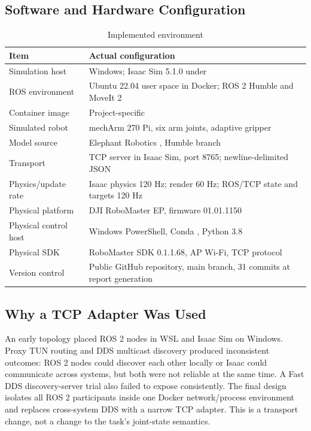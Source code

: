 \documentclass[UTF8,zihao=-4,scheme=chinese,fontset=none]{ctexart}
\begin{document}
\subsection{Software and Hardware Configuration}
\begin{table}[H]\centering\caption{Implemented environment}\label{tab:environment}
\begin{tabularx}{\textwidth}{p{3.4cm}Y}
\toprule Item & Actual configuration\\\midrule
Simulation host & Windows; Isaac Sim 5.1.0 under \\
ROS environment & Ubuntu 22.04 user space in Docker; ROS 2 Humble and MoveIt 2\\
Container image & Project-specific \\
Simulated robot & mechArm 270 Pi, six arm joints, adaptive gripper\\
Model source & Elephant Robotics , Humble branch\cite{elephantrepo}\\
Transport & TCP server in Isaac Sim, port 8765; newline-delimited JSON\\
Physics/update rate & Isaac physics 120 Hz; render 60 Hz; ROS/TCP state and targets 120 Hz\\
Physical platform & DJI RoboMaster EP, firmware 01.01.1150\\
Physical control host & Windows PowerShell, Conda , Python 3.8\\
Physical SDK & RoboMaster SDK 0.1.1.68, AP Wi-Fi, TCP protocol\\
Version control & Public GitHub repository, main branch, 31 commits at report generation\\
\bottomrule
\end{tabularx}
\end{table}

\subsection{Why a TCP Adapter Was Used}
An early topology placed ROS 2 nodes in WSL and Isaac Sim on Windows. Proxy TUN routing and DDS multicast discovery produced inconsistent outcomes: ROS 2 nodes could discover each other locally or Isaac could communicate across systems, but both were not reliable at the same time. A Fast DDS discovery-server trial also failed to expose  consistently. The final design isolates all ROS 2 participants inside one Docker network/process environment and replaces cross-system DDS with a narrow TCP adapter. This is a transport change, not a change to the task's joint-state semantics.
\end{document}
